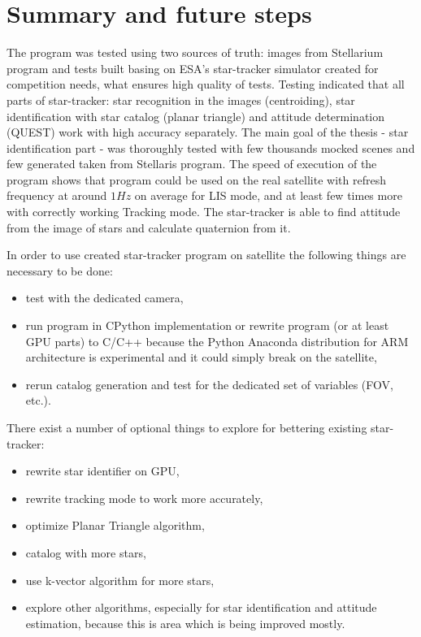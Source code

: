 \documentclass[12pt,a4paper,twoside]{article}
\begin{document}
\newpage
\section{Summary and future steps}

The program was tested using two sources of truth: images from Stellarium program and tests built basing on ESA's star-tracker simulator created for competition needs, what ensures high quality of tests. Testing indicated that all parts of star-tracker: star recognition in the images (centroiding), star identification with star catalog (planar triangle) and attitude determination (QUEST) work with high accuracy separately. The main goal of the thesis - star identification part - was thoroughly tested with few thousands mocked  scenes and few generated taken from Stellaris program. The speed of execution of the program shows that program could be used on the real satellite with refresh frequency at around $1Hz$ on average for LIS mode, and at least few times more with correctly working Tracking mode. The star-tracker is able to find attitude from the image of stars and calculate quaternion from it.

In order to use created star-tracker program on satellite the following things are necessary to be done:
\begin{itemize}
\item test with the dedicated camera,
\item run program in CPython implementation or rewrite program (or at least GPU parts) to C/C++ because the Python Anaconda distribution for ARM architecture is experimental and it could simply break on the satellite,
\item rerun catalog generation and test for the dedicated set of variables (FOV, etc.).
\end{itemize}

There exist a number of optional things to explore for bettering existing star-tracker:
\begin{itemize}
\item rewrite star identifier on GPU,
\item rewrite tracking mode to work more accurately,
\item optimize Planar Triangle algorithm,
\item catalog with more stars,
\item use k-vector algorithm for more stars,
\item explore other algorithms, especially for star identification and attitude estimation, because this is area which is being improved mostly.
\end{itemize}
\end{document}
